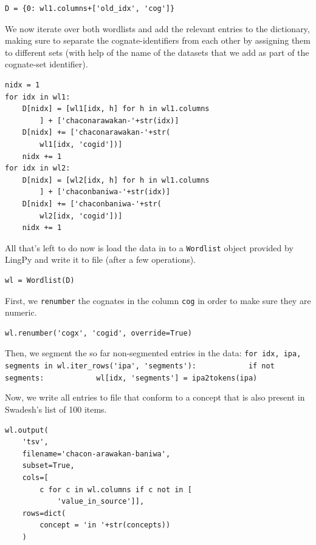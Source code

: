 \documentclass[
  a4paper,
  14pt,
  oneside,
  tablecaptionabove
]{scrbook}
\begin{document}
\begin{lstlisting}[basicstyle=\small]
D = {0: wl1.columns+['old_idx', 'cog']}
\end{lstlisting}

We now iterate over both wordlists and add the relevant entries to the
dictionary, making sure to separate the cognate-identifiers from each
other by assigning them to different sets (with help of the name of the
datasets that we add as part of the cognate-set identifier).

\begin{lstlisting}[basicstyle=\small]
nidx = 1
for idx in wl1:
    D[nidx] = [wl1[idx, h] for h in wl1.columns
        ] + ['chaconarawakan-'+str(idx)]
    D[nidx] += ['chaconarawakan-'+str(
        wl1[idx, 'cogid'])]
    nidx += 1
for idx in wl2:
    D[nidx] = [wl2[idx, h] for h in wl1.columns
        ] + ['chaconbaniwa-'+str(idx)]
    D[nidx] += ['chaconbaniwa-'+str(
        wl2[idx, 'cogid'])]
    nidx += 1
\end{lstlisting}

All that's left to do now is load the data in to a \lstinline!Wordlist!
object provided by LingPy and write it to file (after a few operations).

\begin{lstlisting}[basicstyle=\small]
wl = Wordlist(D)
\end{lstlisting}

First, we \lstinline!renumber! the cognates in the column
\lstinline!cog! in order to make sure they are numeric.

\begin{lstlisting}[basicstyle=\small]
wl.renumber('cogx', 'cogid', override=True)
\end{lstlisting}

Then, we segment the so far non-segmented entries in the data:
\lstinline!for idx, ipa, segments in wl.iter_rows('ipa', 'segments'):            if not segments:            wl[idx, 'segments'] = ipa2tokens(ipa)!

Now, we write all entries to file that conform to a concept that is also
present in Swadesh's list of 100 items.

\begin{lstlisting}[basicstyle=\small]
wl.output(
    'tsv', 
    filename='chacon-arawakan-baniwa', 
    subset=True, 
    cols=[
        c for c in wl.columns if c not in [
            'value_in_source']],
    rows=dict(
        concept = 'in '+str(concepts))
    )
\end{lstlisting}
\end{document}
